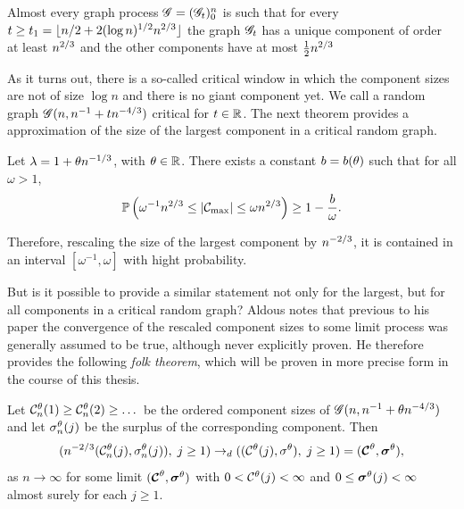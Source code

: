 \begin{theorem}
	Almost every graph process $\mathscr{G} = (\mathscr{G}_t)_0^n$ is such that 
	for every $t \geq t_1 = \lfloor n/2 + 2(\log n)^{1/2}n^{2 / 3} \rfloor$ 
	the graph $\mathscr{G}_t$ has a unique component of order at least $n^{2 / 3}$ and the other components have at most $\frac{1}{2}n^{2 / 3}$
\end{theorem}

As it turns out, there is a so-called critical window in which the component sizes are not of size $\log n$ and there is no giant component yet.
We call a random graph $\mathscr{G}(n, n^{-1} + tn^{-4 / 3})$ critical for $t \in \mathbb{R}$.
The next theorem provides a approximation of the size of the largest component in a critical random graph.

\begin{theorem} \label{T: largest critical cluster}
	Let $\lambda = 1 + \theta n^{-1 / 3}$, with $\theta \in \mathbb{R}$.
	There exists a constant $b = b(\theta)$ such that for all $\omega > 1$,
	\begin{equation}
		\mathbb{P}\left( \omega^{-1} n^{2 / 3} \leq |\mathcal{C}_{\max}| \leq \omega n^{2 / 3}\right) \geq 1 - \frac{b}{\omega}.
	\end{equation}	
\end{theorem}

Therefore, rescaling the size of the largest component by $n^{-2 / 3}$,
it is contained in an interval $[\omega^{-1}, \omega]$ with hight probability.

But is it possible to provide a similar statement not only for the largest, but for all components in a critical random graph?
Aldous notes that previous to his paper
the convergence of the rescaled component sizes to some limit process was generally assumed to be true,
although never explicitly proven.
He therefore provides the following \emph{folk theorem},
which will be proven in more precise form in the course of this thesis.

\begin{folktheorem} \label{T: folk theorem}
	Let $\mathcal{C}^{\theta}_n(1) \geq \mathcal{C}^{\theta}_n(2) \geq \dots$ be the ordered component sizes of
	$\mathscr{G}(n, n^{-1} + \theta n^{-4 / 3})$ and let $\mathcal{\sigma}^{\theta}_n(j)$ be the surplus of the corresponding component.
	Then
	\begin{equation}
		( n^{-2 / 3} ( \mathcal{C}^{\theta}_n(j), \mathcal{\sigma}^{\theta}_n(j) ), \; j \geq 1 ) 
		\rightarrow_d
		( (\mathcal{C}^{\theta}(j), \mathcal{\sigma}^{\theta}), \; j \geq 1 )
		= ( \boldsymbol{\mathcal{C}}^{\theta}, \boldsymbol{\mathcal{\sigma}}^{\theta} ),
	\end{equation}
	as $n \rightarrow \infty$ for some limit $( \boldsymbol{\mathcal{C}}^{\theta}, \boldsymbol{\mathcal{\sigma}}^{\theta} )$
	with $0 < \mathcal{C}^{\theta}(j) < \infty$ and $0 \leq \boldsymbol{\mathcal{\sigma}}^{\theta}(j) < \infty$ almost surely for each $j \geq 1$.
\end{folktheorem}



